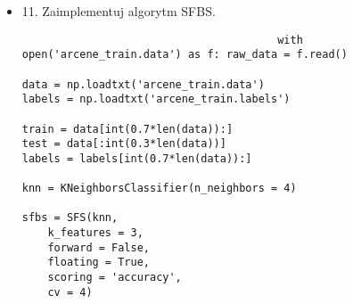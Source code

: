 \documentclass[12pt,a4paper]{article}
\begin{document}
\begin{itemize}
                                \clearpage

                                \item 11. Zaimplementuj algorytm SFBS.
                                \begin{lstlisting}
                                        with open('arcene_train.data') as f: raw_data = f.read()
 
data = np.loadtxt('arcene_train.data')
labels = np.loadtxt('arcene_train.labels')
 
train = data[int(0.7*len(data)):]
test = data[:int(0.3*len(data))]
labels = labels[int(0.7*len(data)):]

knn = KNeighborsClassifier(n_neighbors = 4)
 
sfbs = SFS(knn,
    k_features = 3,
    forward = False,
    floating = True,
    scoring = 'accuracy',
    cv = 4)
                                \end{lstlisting}
                                        
                                        \clearpage

        \end{itemize}
	
\end{document}
